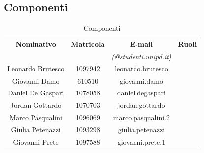 \subsection{Componenti}
\begin{table}[H]
		\begin{center}
		\begin{tabular}{cccc}
			\toprule
			\textbf{Nominativo} & \textbf{Matricola} & \textbf{E-mail} & \textbf{Ruoli} \\
			 &  & \textit{(@studenti.unipd.it)} & \\
			\midrule
	 		\multirow{2}{*}{Leonardo Brutesco} & \multirow{2}{*}{1097942}	& \multirow{2}{*}{leonardo.brutesco}	& \analista{} \\ & & & \verificatore{} \\
			\midrule
			\multirow{2}{*}{Giovanni Damo}	& \multirow{2}{*}{610510}	& \multirow{2}{*}{giovanni.damo} & \analista{}\\ & & &  \amministratore{}\\
			\midrule
			\multirow{2}{*}{Daniel De Gaspari} 	& \multirow{2}{*}{1078058}	& \multirow{2}{*}{daniel.degaspari} & \analista{}\\ & & &  \verificatore{}\\
			\midrule
			\multirow{2}{*}{Jordan Gottardo}	& \multirow{2}{*}{1070703}	& \multirow{2}{*}{jordan.gottardo} & \analista{}\\ & & &  \responsabile{} \\
			\midrule
			\multirow{2}{*}{Marco Pasqualini}	& \multirow{2}{*}{1096069}	&  \multirow{2}{*}{marco.pasqualini.2} & \analista{}\\ & & &  \verificatore{}\\
			\midrule
			\multirow{2}{*}{Giulia	Petenazzi}	& \multirow{2}{*}{1093298}	& \multirow{2}{*}{giulia.petenazzi} & \analista{}\\ & & &  \responsabile{} \\
			\midrule
			\multirow{2}{*}{Giovanni Prete}	& \multirow{2}{*}{1097588}	& \multirow{2}{*}{giovanni.prete.1} & \analista{}\\ & & &  \amministratore{}\\
			\midrule
		\end{tabular}
	\end{center}
	\caption{Componenti}
\end{table}
